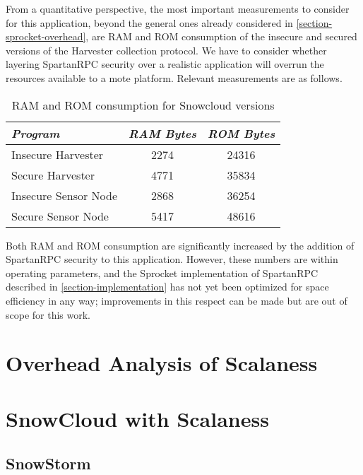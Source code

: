 From a quantitative perspective, the most important measurements to consider for this
application, beyond the general ones already considered in \autoref{section-sprocket-overhead},
are RAM and ROM consumption of the insecure and secured versions of the Harvester collection
protocol. We have to consider whether layering SpartanRPC security over a realistic application
will overrun the resources available to a mote platform. Relevant measurements are as follows.
\begin{table}[h]
\centering \newcommand\T{\rule{0pt}{2.1ex}} \caption{RAM and ROM
  consumption for Snowcloud versions} {
\begin{tabular}{|l|c|c|}
\hline
\emph{Program} \T       & \emph{RAM Bytes} & \emph{ROM Bytes} \\ \hline\hline
Insecure Harvester \T   &             2274 &            24316 \\ \hline
Secure Harvester \T     &             4771 &            35834 \\ \hline
Insecure Sensor Node \T &             2868 &            36254 \\ \hline
Secure Sensor Node \T   &             5417 &            48616 \\ \hline
\end{tabular}
}
\label{table-snowcloud}
\end{table}

Both RAM and ROM consumption are significantly increased by the addition of SpartanRPC security
to this application. However, these numbers are within operating parameters, and the Sprocket
implementation of SpartanRPC described in \autoref{section-implementation} has not yet been
optimized for space efficiency in any way; improvements in this respect can be made but are out
of scope for this work.


\section{Overhead Analysis of Scalaness}


\section{SnowCloud with Scalaness}

\subsection{SnowStorm}

